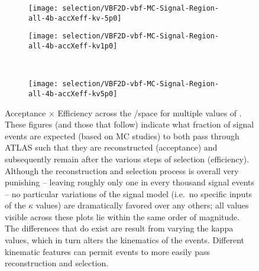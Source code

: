         \begin{figure}[tbh]
            \begin{subfigure}{0.48\textwidth}
                \texttt{[image: selection/VBF2D-vbf-MC-Signal-Region-all-4b-accXeff-kv-5p0]}
                \caption{}
            \end{subfigure}
            \begin{subfigure}{0.48\textwidth}
                \texttt{[image: selection/VBF2D-vbf-MC-Signal-Region-all-4b-accXeff-kv1p0]}
                \caption{}
            \end{subfigure}\\
            \begin{subfigure}{0.48\textwidth}
                \texttt{[image: selection/VBF2D-vbf-MC-Signal-Region-all-4b-accXeff-kv5p0]}
                \caption{}
            \end{subfigure}
            \caption{
                Acceptance $\times$ Efficiency across the \kvv/\kl space for multiple values of \kv.
                These figures (and those that follow) indicate what fraction of signal events are expected (based on MC studies)
                    to both pass through ATLAS such that they are reconstructed (acceptance)
                    and subsequently remain after the various steps of selection (efficiency).
                Although the reconstruction and selection process is overall very punishing -- 
                    leaving roughly only one in every thousand signal events --
                    no particular variations of the signal model (i.e.\ no specific inputs of the $\kappa$ values)
                    are dramatically favored over any others;
                    all values visible across these plots lie within the same order of magnitude.
                The differences that do exist are result from varying the kappa values, which in turn alters the kinematics of the \vbfhhproc events.
                Different kinematic features can permit events to more easily pass reconstruction and selection.
            }
            \label{fig:accXeff_kv}
        \end{figure}

